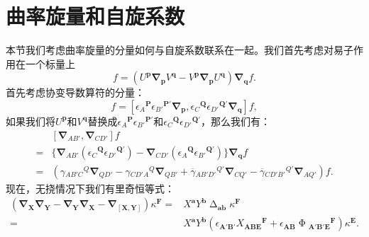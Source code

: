\section{曲率旋量和自旋系数}

本节我们考虑曲率旋量的分量如何与自旋系数联系在一起。我们首先考虑对易子作用在一个标量上
\begin{equation*}
	[\boldsymbol{U} ,\boldsymbol{V}] f=(U^{\boldsymbol{p}}\boldsymbol{\nabla }_{\boldsymbol{p}} V^{\boldsymbol{q}} -V^{\boldsymbol{p}}\boldsymbol{\nabla }_{\boldsymbol{p}} U^{\boldsymbol{q}} )\boldsymbol{\nabla }_{\boldsymbol{q}} f.
\end{equation*}
首先考虑协变导数算符的分量：
\begin{equation*}
	[\boldsymbol{\nabla }_{AB'} ,\boldsymbol{\nabla }_{CD'}] f=[\epsilon {_{A}}^{\boldsymbol{P}} \epsilon {_{B'}}^{\boldsymbol{P} '}\boldsymbol{\nabla }_{\boldsymbol{p}} ,\epsilon {_{C}}^{\boldsymbol{Q}} \epsilon {_{D'}}^{\boldsymbol{Q} '}\boldsymbol{\nabla }_{\boldsymbol{q}} ]f,
\end{equation*}
如果我们将$U^{\boldsymbol{p}}$和$V^{\boldsymbol{q}}$替换成$\epsilon {_{A}}^{\boldsymbol{P}} \epsilon {_{B'}}^{\boldsymbol{P} '}$和$\epsilon {_{C}}^{\boldsymbol{Q}} \epsilon {_{D'}}^{\boldsymbol{Q} '}$，那么我们有：
\begin{equation}
	\begin{aligned}
		& [\mathbf{\nabla }_{AB'} ,\mathbf{\nabla }_{CD'}] f\\
		= & \{\mathbf{\nabla }_{AB'} (\epsilon {_{C}}^{\boldsymbol{Q}} \epsilon {_{D'}}^{\boldsymbol{Q} '} )-\mathbf{\nabla }_{CD'} (\epsilon {_{A}}^{\boldsymbol{Q}} \epsilon {_{B'}}^{\boldsymbol{Q} '} )\}\mathbf{\nabla }_{\boldsymbol{q}} f\\
		= & (\gamma {_{AB'C}}^{Q}\mathbf{\nabla }_{QD'} -\gamma {_{CD'A}}^{Q}\mathbf{\nabla }_{QB'} +\overline{\gamma }{_{AB'D'}}^{Q'}\mathbf{\nabla }_{CQ'} -\overline{\gamma }{_{CD'B'}}^{Q'}\mathbf{\nabla }_{AQ'} )f.
	\end{aligned}
	\label{eq:5.76}
\end{equation}
现在，无挠情况下我们有里奇恒等式：
\begin{equation}
	\begin{aligned}
		(\mathbf{\nabla }_{\boldsymbol{X}}\mathbf{\nabla }_{\boldsymbol{Y}} -\mathbf{\nabla }_{\boldsymbol{Y}}\mathbf{\nabla }_{\boldsymbol{X}} -\mathbf{\nabla }_{[\boldsymbol{X} ,\boldsymbol{Y}]}) \kappa ^{\boldsymbol{F}} = & X^{\boldsymbol{a}} Y^{\boldsymbol{b}} \upDelta _{\boldsymbol{ab}} \kappa ^{\boldsymbol{F}}\\
		= & X^{\boldsymbol{a}} Y^{\boldsymbol{b}} (\epsilon _{\boldsymbol{A} '\boldsymbol{B} '} X{_{\boldsymbol{ABE}}}^{\boldsymbol{F}} +\epsilon _{\boldsymbol{AB}} \upPhi {_{\boldsymbol{A} '\boldsymbol{B} '\boldsymbol{E}}}^{\boldsymbol{F}} )\kappa ^{\boldsymbol{E}} .
	\end{aligned}
	\label{eq:5.77}
\end{equation}

